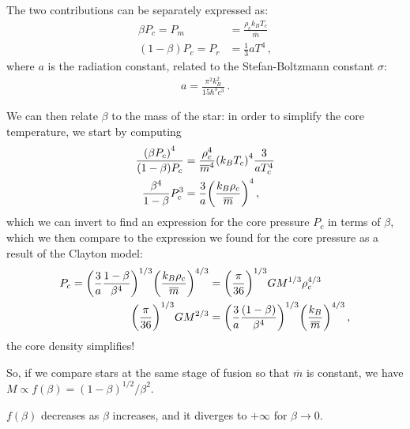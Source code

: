 \documentclass[main.tex]{subfiles}
\begin{document}
The two contributions can be separately expressed as:
%
\begin{align}
  \beta P_c = P_m &= \frac{\rho _c k_B T_c}{\overline{m}} \\
  (1 - \beta ) P_c = P_r &= \frac{1}{3} a T^4
\,,
\end{align}
%
where \(a\) is the radiation constant, related to the Stefan-Boltzmann constant \(\sigma \):
%
\begin{align}
  a = \frac{\pi^2   k_B^2}{15 \hbar^3 c^3}
\,.
\end{align}

We can then relate \(\beta \) to the mass of the star: in order to simplify the core temperature, we start by computing
%
\begin{align}
  \frac{\qty(\beta P_c )^{4}}{(1 - \beta ) P_c} &= \frac{\rho _c^{4}}{\overline{m}^{4}} \qty(k_B T_c)^{4} \frac{3}{a T_c^{4}}  \\
  \frac{\beta^{4}}{1 -\beta } P_c^3 &= \frac{3}{a} \qty(\frac{k_B \rho _c}{\overline{m}})^{4}
\,,
\end{align}
%
which we can invert to find an expression for the core pressure \(P_c \) in terms of \(\beta \), which we then compare to the expression we found for the core pressure as a result of the Clayton model: 
%
\begin{align}
  P_c = \qty(\frac{3}{a} \frac{1 - \beta  }{\beta^{4}})^{1/3} \qty(\frac{k_B \rho _c }{\overline{m}})^{4/3}
  &= \qty(\frac{\pi }{36})^{1/3} G M^{1/3} \rho _c^{4/3} \\
  \qty(\frac{\pi }{36})^{1/3} G M^{2/3} 
  &= \qty(\frac{3}{a} \frac{(1-\beta )}{\beta^{4}})^{1/3}
  \qty(\frac{k_B}{\overline{m}})^{4/3}
  \label{eq:maximum-mass-main-sequence}
\,,
\end{align}
%
the core density simplifies! 

So, if we compare stars at the same stage of fusion so that \(\overline{m}\) is constant, we have \(M \propto f(\beta ) = (1 - \beta )^{1/2} / \beta^2\).  

\(f(\beta )\) decreases as \(\beta \) increases, and it diverges to \(+ \infty \) for \(\beta \to 0\). 
\end{document}
